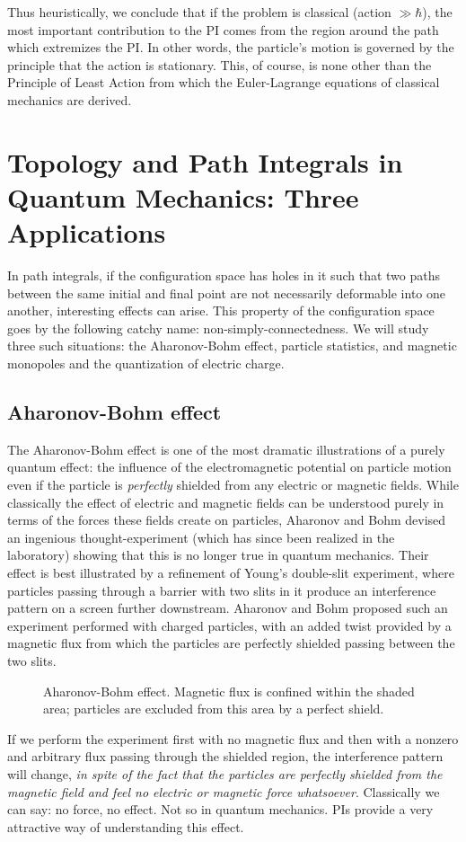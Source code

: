\documentclass[12pt]{article}
\begin{document}
Thus heuristically, we conclude that if the problem is classical
(action $\gg\hbar$), the most important contribution to the PI comes
from the region around the path which extremizes the PI. In other
words, the particle's motion is governed by the principle that the
action is stationary. This, of course, is none other than the
Principle of Least Action from which the Euler-Lagrange equations of
classical mechanics are derived.



\section[Topology and Path Integrals]
{Topology and Path Integrals in Quantum Mechanics: Three Applications}

In path integrals, if the configuration space has holes in it such
that two paths between the same initial and final point are
not necessarily deformable into one another, interesting effects can
arise. This property of the configuration space goes by the following
catchy name: non-sim\-ply-con\-nec\-ted\-ness. We will study three
such situations: the Aharonov-Bohm effect, particle statistics, and
magnetic monopoles and the quantization of electric charge.

\subsection{Aharonov-Bohm effect}
The Aharonov-Bohm effect is one of the most dramatic illustrations of
a purely quantum effect: the influence of the electromagnetic
potential on particle motion even if the particle is {\em perfectly}
shielded from any electric or magnetic fields. While classically the
effect of electric and magnetic fields can be understood purely in
terms of the forces these fields create on particles, Aharonov and
Bohm devised an ingenious thought-experiment (which has since been
realized in the laboratory) showing that this is no longer true in
quantum mechanics. Their effect is best illustrated by a refinement of
Young's double-slit experiment, where particles passing through a
barrier with two slits in it produce an interference
pattern on a screen further downstream.
Aharonov and Bohm proposed such an experiment performed with
charged particles, with an added twist provided
by a magnetic flux from which
the particles are perfectly shielded passing between the two slits.
\begin{figure}[hb]
\epsfysize=7cm
\centerline{}
\caption[Aharonov-Bohm effect.]{Aharonov-Bohm effect. Magnetic flux
is confined within the shaded area; particles are excluded from
this area by a perfect shield.}
\end{figure}
If we perform the experiment first with no magnetic flux and then with
a nonzero and arbitrary flux passing through the shielded region, the
interference pattern will change, {\em in spite of the fact that the
  particles are perfectly shielded from the magnetic field and feel no
  electric or magnetic force whatsoever}. Classically we can say: no
force, no effect. Not so in quantum mechanics.
PIs provide a very attractive way of
understanding this effect.
\end{document}
